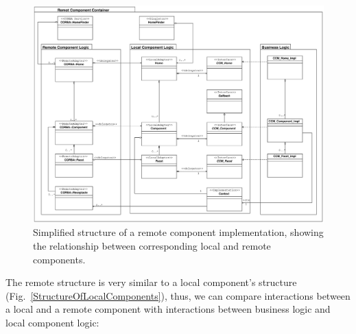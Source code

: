\begin{figure}[htbp]
    \begin{center}
    \includegraphics [width=15cm,angle=0] 
		     {uml/StructureOfRemoteComponents.eps}
    \caption{Simplified structure of a remote component implementation,
    showing the relationship between corresponding local and remote components.}
    \label{StructureOfRemoteComponents}            
    \end{center}
\end{figure}

\noindent
The remote structure is very similar to a local component's structure 
(Fig.~\ref{StructureOfLocalComponents}), thus, we can compare interactions
between a local and a remote component with interactions between business logic
and local component logic:

